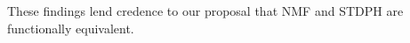 These findings lend credence to our proposal that \ac{NMF} and \ac{STDPH} 
are functionally equivalent.




